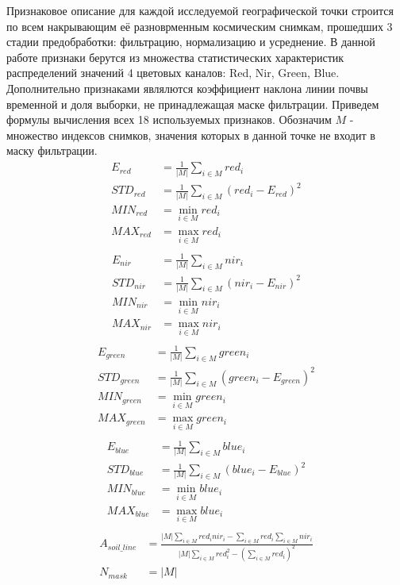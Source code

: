 \documentclass[14pt]{extarticle}
\begin{document}
Признаковое описание для каждой исследуемой географической точки строится по всем накрывающим
её разноврменным космическим снимкам, прошедших 3 стадии предобработки: фильтрацию,
нормализацию и усреднение. В данной работе признаки берутся из множества статистических
характеристик распределений значений 4 цветовых каналов: Red, Nir, Green, Blue. Дополнительно
признаками являлются коэффициент наклона линии почвы временной и доля выборки, не принадлежащая
маске фильтрации. Приведем формулы вычисления всех 18 используемых признаков. Обозначим 
$M$ - множество индексов снимков, значения которых в данной точке не входит в маску фильтрации.
\begin{align*}
    E_{red} &= \frac{1}{|M|}\sum_{i \in M} red_i \\
    STD_{red} &= \frac{1}{|M|}\sum_{i \in M} (red_i - E_{red})^2 \\
    MIN_{red} &= \min_{i \in M} red_i \\
    MAX_{red} &= \max_{i \in M} red_i \\
\end{align*}
\begin{align*}
    E_{nir} &= \frac{1}{|M|}\sum_{i \in M} nir_i \\
    STD_{nir} &= \frac{1}{|M|}\sum_{i \in M} (nir_i - E_{nir})^2 \\
    MIN_{nir} &= \min_{i \in M} nir_i \\
    MAX_{nir} &= \max_{i \in M} nir_i \\
\end{align*}
\begin{align*}
    E_{green} &= \frac{1}{|M|}\sum_{i \in M} green_i \\
    STD_{green} &= \frac{1}{|M|}\sum_{i \in M} (green_i - E_{green})^2 \\
    MIN_{green} &= \min_{i \in M} green_i \\
    MAX_{green} &= \max_{i \in M} green_i \\
\end{align*}
\begin{align*}
    E_{blue} &= \frac{1}{|M|}\sum_{i \in M} blue_i \\
    STD_{blue} &= \frac{1}{|M|}\sum_{i \in M} (blue_i - E_{blue})^2 \\
    MIN_{blue} &= \min_{i \in M} blue_i \\
    MAX_{blue} &= \max_{i \in M} blue_i \\
\end{align*}
\begin{align*}
    A_{soil\_line} &= \frac{|M|\sum_{i \in M} red_i nir_i - 
                            \sum_{i \in M} red_i \sum_{i \in M} nir_i}
                           {|M|\sum_{i \in M} red_i^2 - 
                            \left(\sum_{i \in M} red_i\right)^2} \\
    N_{mask} &= |M|
\end{align*}
\end{document}
